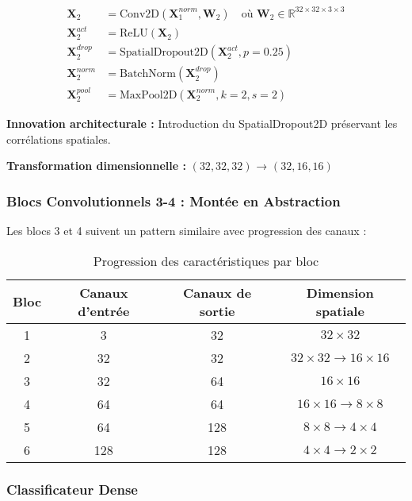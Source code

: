 \documentclass[12pt,a4paper]{article}
\begin{document}
\begin{align}
\mathbf{X}_2 &= \text{Conv2D}(\mathbf{X}_1^{norm}, \mathbf{W}_2) \quad \text{où } \mathbf{W}_2 \in \mathbb{R}^{32 \times 32 \times 3 \times 3} \\
\mathbf{X}_2^{act} &= \text{ReLU}(\mathbf{X}_2) \\
\mathbf{X}_2^{drop} &= \text{SpatialDropout2D}(\mathbf{X}_2^{act}, p=0.25) \\
\mathbf{X}_2^{norm} &= \text{BatchNorm}(\mathbf{X}_2^{drop}) \\
\mathbf{X}_2^{pool} &= \text{MaxPool2D}(\mathbf{X}_2^{norm}, k=2, s=2)
\end{align}

\textbf{Innovation architecturale :} Introduction du SpatialDropout2D préservant les corrélations spatiales.

\textbf{Transformation dimensionnelle :} $(32, 32, 32)$ → $(32, 16, 16)$

\subsubsection{Blocs Convolutionnels 3-4 : Montée en Abstraction}

Les blocs 3 et 4 suivent un pattern similaire avec progression des canaux :

\begin{table}[H]
\centering
\caption{Progression des caractéristiques par bloc}
\begin{tabular}{cccc}
\toprule
\textbf{Bloc} & \textbf{Canaux d'entrée} & \textbf{Canaux de sortie} & \textbf{Dimension spatiale} \\
\midrule
1 & 3 & 32 & $32 \times 32$ \\
2 & 32 & 32 & $32 \times 32 \rightarrow 16 \times 16$ \\
3 & 32 & 64 & $16 \times 16$ \\
4 & 64 & 64 & $16 \times 16 \rightarrow 8 \times 8$ \\
5 & 64 & 128 & $8 \times 8 \rightarrow 4 \times 4$ \\
6 & 128 & 128 & $4 \times 4 \rightarrow 2 \times 2$ \\
\bottomrule
\end{tabular}
\end{table}

\subsubsection{Classificateur Dense}
\end{document}
